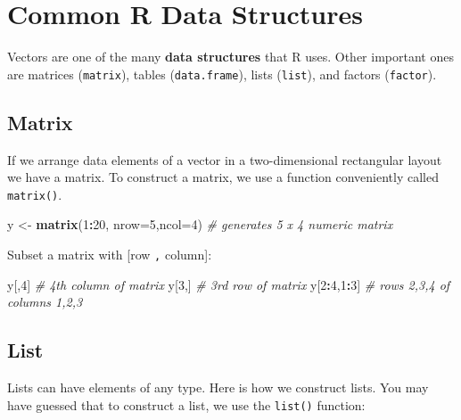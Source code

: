 \documentclass[
]{book}
\newenvironment{Shaded}{\begin{snugshade}}{\end{snugshade}}
\newcommand{\AttributeTok}[1]{\textcolor[rgb]{0.13,0.29,0.53}{#1}}
\newcommand{\CommentTok}[1]{\textcolor[rgb]{0.56,0.35,0.01}{\textit{#1}}}
\newcommand{\DecValTok}[1]{\textcolor[rgb]{0.00,0.00,0.81}{#1}}
\newcommand{\FunctionTok}[1]{\textcolor[rgb]{0.13,0.29,0.53}{\textbf{#1}}}
\newcommand{\NormalTok}[1]{#1}
\newcommand{\OtherTok}[1]{\textcolor[rgb]{0.56,0.35,0.01}{#1}}
\newcommand{\SpecialCharTok}[1]{\textcolor[rgb]{0.81,0.36,0.00}{\textbf{#1}}}
\begin{document}
\hypertarget{common-r-data-structures}{%
\section{Common R Data Structures}\label{common-r-data-structures}}

Vectors are one of the many \textbf{data structures} that R uses. Other important
ones are matrices (\texttt{matrix}), tables (\texttt{data.frame}), lists (\texttt{list}), and
factors (\texttt{factor}).

\hypertarget{matrix}{%
\subsection{Matrix}\label{matrix}}

If we arrange data elements of a vector in a two-dimensional rectangular layout we have a matrix. To construct a matrix, we use a function conveniently called \texttt{matrix()}.

\begin{Shaded}
\begin{Highlighting}[]
\NormalTok{y }\OtherTok{\textless{}{-}} \FunctionTok{matrix}\NormalTok{(}\DecValTok{1}\SpecialCharTok{:}\DecValTok{20}\NormalTok{, }\AttributeTok{nrow=}\DecValTok{5}\NormalTok{,}\AttributeTok{ncol=}\DecValTok{4}\NormalTok{) }\CommentTok{\# generates 5 x 4 numeric matrix}
\end{Highlighting}
\end{Shaded}

Subset a matrix with {[}row \texttt{,} column{]}:

\begin{Shaded}
\begin{Highlighting}[]
\NormalTok{y[,}\DecValTok{4}\NormalTok{]       }\CommentTok{\# 4th column of matrix}
\NormalTok{y[}\DecValTok{3}\NormalTok{,]       }\CommentTok{\# 3rd row of matrix}
\NormalTok{y[}\DecValTok{2}\SpecialCharTok{:}\DecValTok{4}\NormalTok{,}\DecValTok{1}\SpecialCharTok{:}\DecValTok{3}\NormalTok{]  }\CommentTok{\# rows 2,3,4 of columns 1,2,3}
\end{Highlighting}
\end{Shaded}

\hypertarget{list}{%
\subsection{List}\label{list}}

Lists can have elements of any type. Here is how we construct lists. You may have guessed that to construct a list, we use the \texttt{list()} function:
\end{document}
